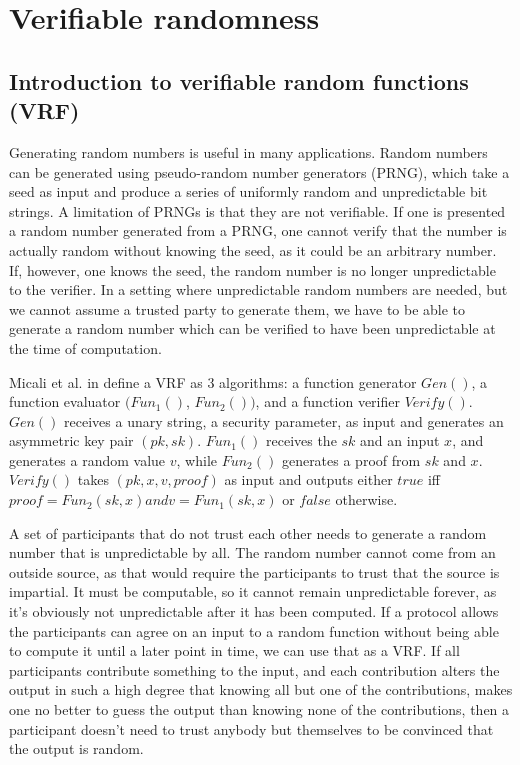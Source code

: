 \section{Verifiable randomness}
\label{sec:vrf}

\subsection{Introduction to verifiable random functions (VRF)}

Generating random numbers is useful in many applications. Random numbers can be generated using pseudo-random number generators (PRNG), which take a seed as input and produce a series of uniformly random and unpredictable bit strings. A limitation of PRNGs is that they are not verifiable. If one is presented a random number generated from a PRNG, one cannot verify that the number is actually random without knowing the seed, as it could be an arbitrary number. If, however, one knows the seed, the random number is no longer unpredictable to the verifier. In a setting where unpredictable random numbers are needed, but we cannot assume a trusted party to generate them, we have to be able to generate a random number which can be verified to have been unpredictable at the time of computation.

Micali et al. in \cite{micali_verifiable_1999} define a VRF as 3 algorithms: a function generator $Gen()$, a function evaluator $(Fun_1()$, $Fun_2())$, and a function verifier $Verify()$. $Gen()$ receives a unary string, a security parameter, as input and generates an asymmetric key pair $(pk, sk)$. $Fun_1()$ receives the $sk$ and an input $x$, and generates a random value $v$, while $Fun_2()$ generates a proof from $sk$ and $x$. $Verify()$ takes $(pk, x, v, proof)$ as input and outputs either $true$ iff $proof=Fun_2(sk, x) and v=Fun_1(sk, x)$ or $false$ otherwise.

A set of participants that do not trust each other needs to generate a random number that is unpredictable by all. The random number cannot come from an outside source, as that would require the participants to trust that the source is impartial. It must be computable, so it cannot remain unpredictable forever, as it's obviously not unpredictable after it has been computed. If a protocol allows the participants can agree on an input to a random function without being able to compute it until a later point in time, we can use that as a VRF. If all participants contribute something to the input, and each contribution alters the output in such a high degree that knowing all but one of the contributions, makes one no better to guess the output than knowing none of the contributions, then a participant doesn't need to trust anybody but themselves to be convinced that the output is random.

